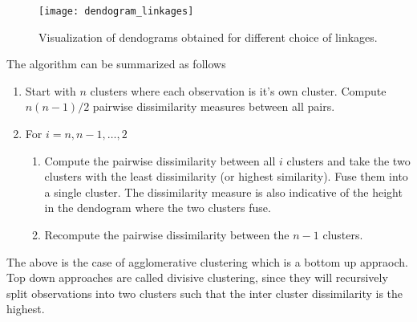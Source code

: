 \documentclass[../statistical_learning_notes.tex]{subfiles}
\begin{document}
    \begin{figure}[h]
    \texttt{[image: dendogram\_linkages]}
    \centering
    \caption{Visualization of dendograms obtained for different choice of linkages.}
    \label{fig:dendogram_linkages} %
    \end{figure}

    The algorithm can be summarized as follows
    \begin{enumerate}
        \item Start with $n$ clusters where each observation is it's own cluster. Compute $n(n-1)/2$ pairwise dissimilarity measures between all pairs.
        \item For $i=n, n-1, \ldots, 2$
        \begin{enumerate}
            \item Compute the pairwise dissimilarity between all $i$ clusters and take the two clusters with the least dissimilarity (or highest similarity). Fuse them into a single cluster. The dissimilarity measure is also indicative of the height in the dendogram where the two clusters fuse.
            \item Recompute the pairwise dissimilarity between the $n-1$ clusters.
        \end{enumerate}
    \end{enumerate}

    The above is the case of agglomerative clustering which is a bottom up appraoch. Top down approaches are called divisive clustering, since they will recursively split observations into two clusters such that the inter cluster dissimilarity is the highest.


\end{document}
